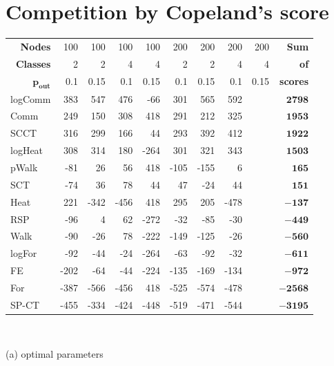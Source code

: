 \documentclass{article}
\begin{document}
\section{Competition by Copeland's score}
\begin{table}[H]{\small
	\begin{minipage}{.49\textwidth}		
		\centering
		\begin{tabular}{lrrrrrrrrr}
			\toprule
			\multicolumn{1}{r}{\textbf{Nodes}}         & 100&    100& 100&  100& 200&  200& 200&  200&{\textbf{Sum}} \\
			\multicolumn{1}{r}{\textbf{Classes}}	   &   2&      2&   4&    4&   2&    2&   4&    4&{\textbf{  of}} \\  %
			\multicolumn{1}{r}{$\bm{p_{\mathbf{out}}}$}& 0.1&	0.15& 0.1& 0.15& 0.1& 0.15& 0.1& 0.15&{\textbf{scores}} \\
			\midrule
            logComm &	383 &	547 &	476 &	-66 &	301 &	565 &	592 &	 &	$\bm{2798}$\\
            Comm &	249 &	150 &	308 &	418 &	291 &	212 &	325 &	 &	$\bm{1953}$\\
            SCCT &	316 &	299 &	166 &	44 &	293 &	392 &	412 &	 &	$\bm{1922}$\\
            logHeat &	308 &	314 &	180 &	-264 &	301 &	321 &	343 &	 &	$\bm{1503}$\\
            pWalk &	-81 &	26 &	56 &	418 &	-105 &	-155 &	6 &	 &	$\bm{165}$\\
            SCT &	-74 &	36 &	78 &	44 &	47 &	-24 &	44 &	 &	$\bm{151}$\\
            Heat &	221 &	-342 &	-456 &	418 &	295 &	205 &	-478 &	 &	$\bm{-137}$\\
            RSP &	-96 &	4 &	62 &	-272 &	-32 &	-85 &	-30 &	 &	$\bm{-449}$\\
            Walk &	-90 &	-26 &	78 &	-222 &	-149 &	-125 &	-26 &	 &	$\bm{-560}$\\
            logFor &	-92 &	-44 &	-24 &	-264 &	-63 &	-92 &	-32 &	 &	$\bm{-611}$\\
            FE &	-202 &	-64 &	-44 &	-224 &	-135 &	-169 &	-134 &	 &	$\bm{-972}$\\
            For &	-387 &	-566 &	-456 &	418 &	-525 &	-574 &	-478 &	 &	$\bm{-2568}$\\
            SP-CT &	-455 &	-334 &	-424 &	-448 &	-519 &	-471 &	-544 &	 &	$\bm{-3195}$\\
			\bottomrule
		\end{tabular}
		\\[8pt]\centerline{(a) optimal parameters}

\end{minipage}}
\end{table}
\end{document}
